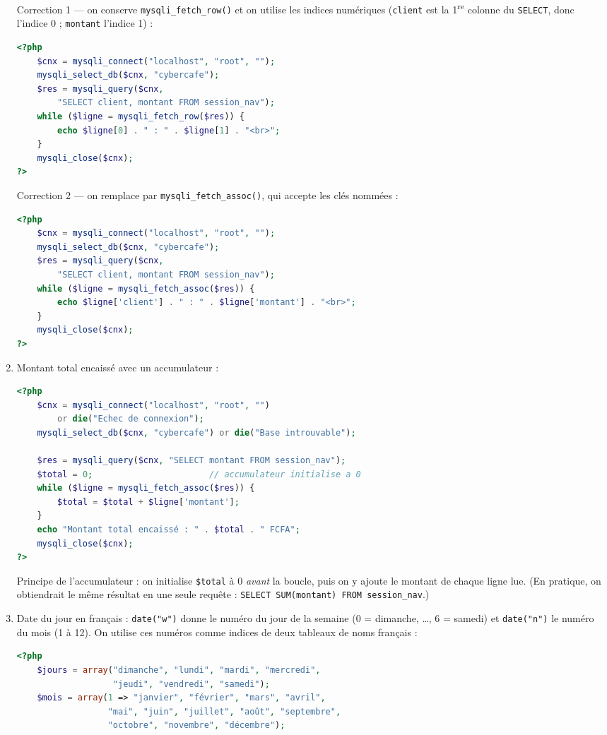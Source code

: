 \documentclass[11pt]{article}
\begin{document}
\begin{corrige}
\begin{enumerate}
Correction 1 — on conserve \texttt{mysqli\_fetch\_row()} et on utilise les indices numériques (\texttt{client} est la 1\textsuperscript{re} colonne du \texttt{SELECT}, donc l'indice 0 ; \texttt{montant} l'indice 1) :
\begin{lstlisting}[language=Php]
<?php
    $cnx = mysqli_connect("localhost", "root", "");
    mysqli_select_db($cnx, "cybercafe");
    $res = mysqli_query($cnx,
        "SELECT client, montant FROM session_nav");
    while ($ligne = mysqli_fetch_row($res)) {
        echo $ligne[0] . " : " . $ligne[1] . "<br>";
    }
    mysqli_close($cnx);
?>
\end{lstlisting}
Correction 2 — on remplace par \texttt{mysqli\_fetch\_assoc()}, qui accepte les clés nommées :
\begin{lstlisting}[language=Php]
<?php
    $cnx = mysqli_connect("localhost", "root", "");
    mysqli_select_db($cnx, "cybercafe");
    $res = mysqli_query($cnx,
        "SELECT client, montant FROM session_nav");
    while ($ligne = mysqli_fetch_assoc($res)) {
        echo $ligne['client'] . " : " . $ligne['montant'] . "<br>";
    }
    mysqli_close($cnx);
?>
\end{lstlisting}
\item Montant total encaissé avec un accumulateur :
\begin{lstlisting}[language=Php]
<?php
    $cnx = mysqli_connect("localhost", "root", "")
        or die("Echec de connexion");
    mysqli_select_db($cnx, "cybercafe") or die("Base introuvable");

    $res = mysqli_query($cnx, "SELECT montant FROM session_nav");
    $total = 0;                       // accumulateur initialise a 0
    while ($ligne = mysqli_fetch_assoc($res)) {
        $total = $total + $ligne['montant'];
    }
    echo "Montant total encaissé : " . $total . " FCFA";
    mysqli_close($cnx);
?>
\end{lstlisting}
Principe de l'accumulateur : on initialise \texttt{\$total} à 0 \emph{avant} la boucle, puis on y ajoute le montant de chaque ligne lue. (En pratique, on obtiendrait le même résultat en une seule requête : \texttt{SELECT SUM(montant) FROM session\_nav}.)
\item Date du jour en français : \texttt{date("w")} donne le numéro du jour de la semaine (0 = dimanche, \dots, 6 = samedi) et \texttt{date("n")} le numéro du mois (1 à 12). On utilise ces numéros comme indices de deux tableaux de noms français :
\begin{lstlisting}[language=Php]
<?php
    $jours = array("dimanche", "lundi", "mardi", "mercredi",
                   "jeudi", "vendredi", "samedi");
    $mois = array(1 => "janvier", "février", "mars", "avril",
                  "mai", "juin", "juillet", "août", "septembre",
                  "octobre", "novembre", "décembre");


\end{lstlisting}
\end{enumerate}
\end{corrige}
\end{document}
